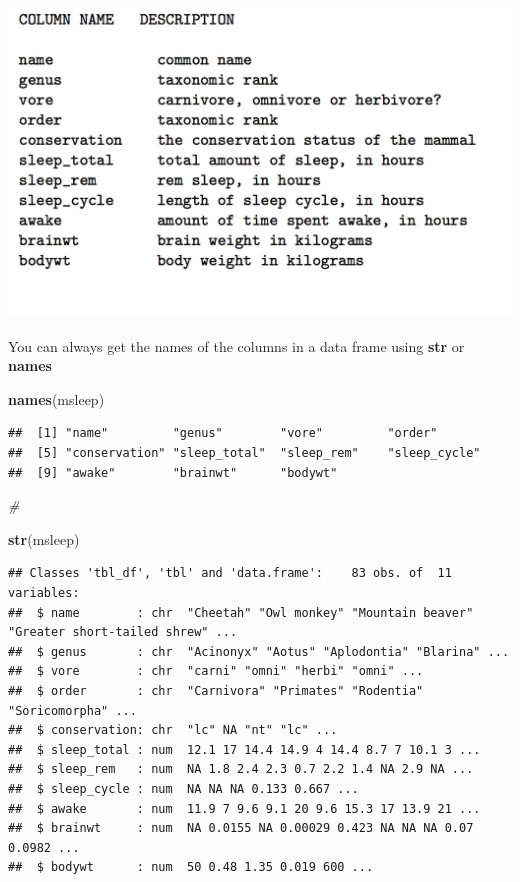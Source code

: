 \documentclass[]{book}
\newenvironment{Shaded}{\begin{snugshade}}{\end{snugshade}}
\newcommand{\CommentTok}[1]{\textcolor[rgb]{0.56,0.35,0.01}{\textit{#1}}}
\newcommand{\KeywordTok}[1]{\textcolor[rgb]{0.13,0.29,0.53}{\textbf{#1}}}
\newcommand{\NormalTok}[1]{#1}
\begin{document}
\includegraphics[width=6.25in,height=\textheight]{./figures/vore.png}

You can always get the names of the columns in a data frame using \textbf{str} or \textbf{names}

\begin{Shaded}
\begin{Highlighting}[]
\KeywordTok{names}\NormalTok{(msleep)}
\end{Highlighting}
\end{Shaded}

\begin{verbatim}
##  [1] "name"         "genus"        "vore"         "order"       
##  [5] "conservation" "sleep_total"  "sleep_rem"    "sleep_cycle" 
##  [9] "awake"        "brainwt"      "bodywt"
\end{verbatim}

\begin{Shaded}
\begin{Highlighting}[]
\CommentTok{#}

\KeywordTok{str}\NormalTok{(msleep)}
\end{Highlighting}
\end{Shaded}

\begin{verbatim}
## Classes 'tbl_df', 'tbl' and 'data.frame':    83 obs. of  11 variables:
##  $ name        : chr  "Cheetah" "Owl monkey" "Mountain beaver" "Greater short-tailed shrew" ...
##  $ genus       : chr  "Acinonyx" "Aotus" "Aplodontia" "Blarina" ...
##  $ vore        : chr  "carni" "omni" "herbi" "omni" ...
##  $ order       : chr  "Carnivora" "Primates" "Rodentia" "Soricomorpha" ...
##  $ conservation: chr  "lc" NA "nt" "lc" ...
##  $ sleep_total : num  12.1 17 14.4 14.9 4 14.4 8.7 7 10.1 3 ...
##  $ sleep_rem   : num  NA 1.8 2.4 2.3 0.7 2.2 1.4 NA 2.9 NA ...
##  $ sleep_cycle : num  NA NA NA 0.133 0.667 ...
##  $ awake       : num  11.9 7 9.6 9.1 20 9.6 15.3 17 13.9 21 ...
##  $ brainwt     : num  NA 0.0155 NA 0.00029 0.423 NA NA NA 0.07 0.0982 ...
##  $ bodywt      : num  50 0.48 1.35 0.019 600 ...
\end{verbatim}
\end{document}
